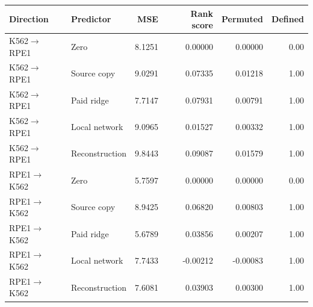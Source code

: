 \begin{tabular}{llrrrr}
\toprule
Direction & Predictor & MSE & Rank score & Permuted & Defined \\
\midrule
K562$\to$RPE1 & Zero & 8.1251 & 0.00000 & 0.00000 & 0.00 \\
K562$\to$RPE1 & Source copy & 9.0291 & 0.07335 & 0.01218 & 1.00 \\
K562$\to$RPE1 & Paid ridge & 7.7147 & 0.07931 & 0.00791 & 1.00 \\
K562$\to$RPE1 & Local network & 9.0965 & 0.01527 & 0.00332 & 1.00 \\
K562$\to$RPE1 & Reconstruction & 9.8443 & 0.09087 & 0.01579 & 1.00 \\
RPE1$\to$K562 & Zero & 5.7597 & 0.00000 & 0.00000 & 0.00 \\
RPE1$\to$K562 & Source copy & 8.9425 & 0.06820 & 0.00803 & 1.00 \\
RPE1$\to$K562 & Paid ridge & 5.6789 & 0.03856 & 0.00207 & 1.00 \\
RPE1$\to$K562 & Local network & 7.7433 & -0.00212 & -0.00083 & 1.00 \\
RPE1$\to$K562 & Reconstruction & 7.6081 & 0.03903 & 0.00300 & 1.00 \\
\bottomrule
\end{tabular}
